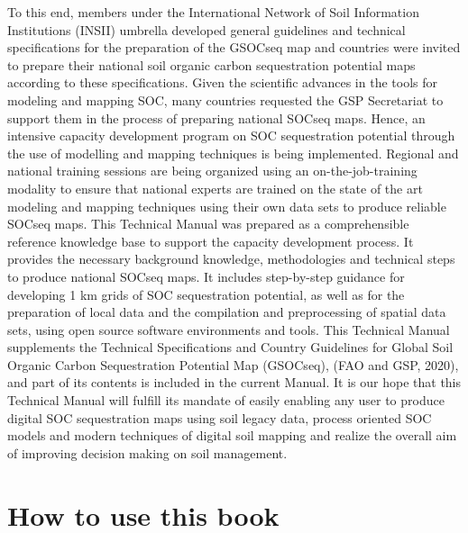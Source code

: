 \documentclass[
  10pt,
  b5paper,
]{book}
\begin{document}
To this end, members under the International Network of Soil Information Institutions (INSII) umbrella developed general guidelines and technical specifications for the preparation of the GSOCseq map and countries were invited to prepare their national soil organic carbon sequestration potential maps according to these specifications. Given the scientific advances in the tools for modeling and mapping SOC, many countries requested the GSP Secretariat to support them in the process of preparing national SOCseq maps. Hence, an intensive capacity development program on SOC sequestration potential through the use of modelling and mapping techniques is being implemented. Regional and national training sessions are being organized using an on-the-job-training modality to ensure that national experts are trained on the state of the art modeling and mapping techniques using their own data sets to produce reliable SOCseq maps.
This Technical Manual was prepared as a comprehensible reference knowledge base to support the capacity development process. It provides the necessary background knowledge, methodologies and technical steps to produce national SOCseq maps. It includes step-by-step guidance for developing 1 km grids of SOC sequestration potential, as well as for the preparation of local data and the compilation and preprocessing of spatial data sets, using open source software environments and tools.
This Technical Manual supplements the Technical Specifications and Country Guidelines for Global Soil Organic Carbon Sequestration Potential Map (GSOCseq), (FAO and GSP, 2020), and part of its contents is included in the current Manual.
It is our hope that this Technical Manual will fulfill its mandate of easily enabling any user to produce digital SOC sequestration maps using soil legacy data, process oriented SOC models and modern techniques of digital soil mapping and realize the overall aim of improving decision making on soil management.

\hypertarget{how-to-use-this-book}{%
\section{How to use this book}\label{how-to-use-this-book}}
\end{document}
